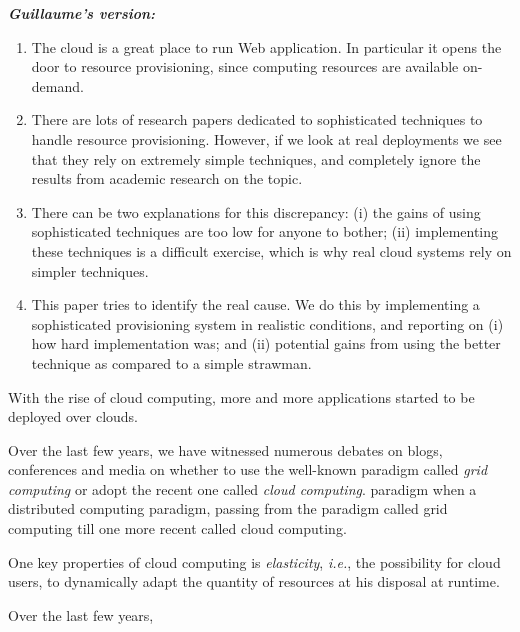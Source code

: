 {\em \textbf{Guillaume's version:}
  \begin{enumerate}
  \item The cloud is a great place to run Web application. In
    particular it opens the door to resource provisioning, since
    computing resources are available on-demand.
  \item There are lots of research papers dedicated to sophisticated
    techniques to handle resource provisioning. However, if we look at
    real deployments we see that they rely on extremely simple
    techniques, and completely ignore the results from academic
    research on the topic.
  \item There can be two explanations for this discrepancy: (i) the
    gains of using sophisticated techniques are too low for anyone to
    bother; (ii) implementing these techniques is a difficult
    exercise, which is why real cloud systems rely on simpler
    techniques.
  \item This paper tries to identify the real cause. We do this by
    implementing a sophisticated provisioning system in realistic
    conditions, and reporting on (i) how hard implementation was; and
    (ii) potential gains from using the better technique as compared
    to a simple strawman.
  \end{enumerate}
}

With the rise of cloud computing, more and more applications started to be deployed over clouds.

Over the last few years, we have witnessed numerous debates on blogs, conferences and media on whether to use the well-known paradigm called \emph{grid computing} or adopt the recent one called \emph{cloud computing}.  paradigm when a distributed computing paradigm, passing from the paradigm called grid computing till one more recent called cloud computing.

 One
key properties of cloud computing is \emph{elasticity}, \emph{i.e.}, the
possibility for cloud users, to dynamically adapt the quantity of resources at
his disposal at runtime. 

Over the last few years, 
